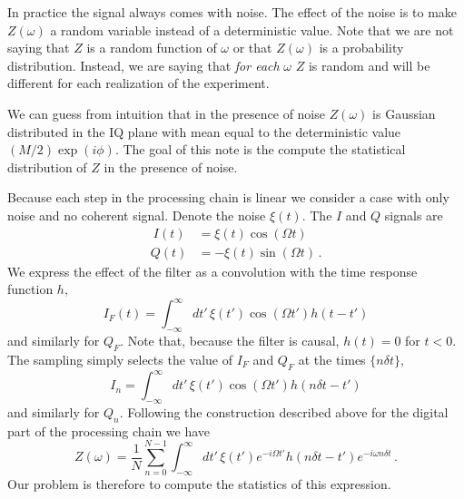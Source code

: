In practice the signal always comes with noise.
The effect of the noise is to make $Z(\omega)$ a random variable instead of a deterministic value.
Note that we are not saying that $Z$ is a random function of $\omega$ or that $Z(\omega)$ is a probability distribution.
Instead, we are saying that \emph{for each }$\omega$ $Z$ is random and will be different for each realization of the experiment.

We can guess from intuition that in the presence of noise $Z(\omega)$ is Gaussian distributed in the IQ plane with mean equal to the deterministic value $(M/2)\exp(i \phi)$.
The goal of this note is the compute the statistical distribution of $Z$ in the presence of noise.

Because each step in the processing chain is linear we consider a case with only noise and no coherent signal.
Denote the noise $\xi(t)$.
The $I$ and $Q$ signals are
\begin{align}\
I(t) &= \xi(t) \cos(\Omega t) \\
Q(t) &= - \xi(t) \sin(\Omega t) \, .
\end{align}
We express the effect of the filter as a convolution with the time response function $h$,
\begin{equation}
I_F(t) = \int_{-\infty}^\infty dt' \, \xi(t') \cos(\Omega t') h(t - t')
\end{equation}
and similarly for $Q_F$.
Note that, because the filter is causal, $h(t)=0$ for $t<0$.
The sampling simply selects the value of $I_F$ and $Q_F$ at the times $\{ n \delta t \}$,
\begin{equation}
I_n = \int_{-\infty}^\infty dt' \, \xi(t') \cos(\Omega t') h(n \delta t - t')
\end{equation}
and similarly for $Q_n$.
Following the construction described above for the digital part of the processing chain we have
\begin{equation}
Z(\omega) =
\frac{1}{N}\sum_{n=0}^{N-1} \int_{-\infty}^\infty dt' \, \xi(t') e^{-i \Omega t'} h(n \delta t - t') e^{-i \omega n \delta t} \, .
\end{equation}
Our problem is therefore to compute the statistics of this expression.

